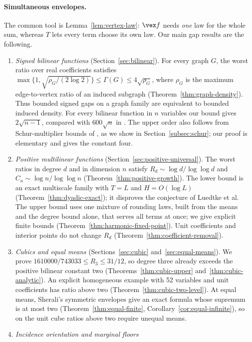 \documentclass[11pt]{article}
\begin{document}
\paragraph{Simultaneous envelopes.}
The common tool is Lemma~\ref{lem:vertex-law}: $\vex f$ needs \emph{one}
law for the whole sum, whereas $T$ lets every term choose its own law.
Our main gap results are the following.
\begin{enumerate}
\item \emph{Signed bilinear functions}
(Section~\ref{sec:bilinear}). For every graph $G$, the worst ratio over
real coefficients satisfies
$\max\{1,\sqrt{\rho_G/(2\log2)}\}\le\Gamma(G)\le4\sqrt{\rho_G}$, where
$\rho_G$ is the maximum edge-to-vertex ratio of an induced subgraph
(Theorem~\ref{thm:graph-density}). Thus bounded signed gaps on a graph
family are equivalent to bounded induced density. For every bilinear
function in $n$ variables our bound gives $2\sqrt{n-1}$, compared with
$600\sqrt n$ in \citet[Theorem 2]{Boland2017}. The upper order also
follows from Schur-multiplier bounds of \citet{DavidsonDonsig2007}, as we
show in Section~\ref{subsec:schur}; our proof is elementary and gives the
constant four.
\item \emph{Positive multilinear functions}
(Section~\ref{sec:positive-universal}). The worst ratios in degree $d$ and
in dimension $n$ satisfy $R_d\sim\log d/\log\log d$ and
$C_n\sim\log n/\log\log n$ (Theorem~\ref{thm:positive-growth}). The lower
bound is an exact multiscale family with $T=L$ and $H=O(\log L)$
(Theorem~\ref{thm:dyadic-exact}); it disproves the conjecture of Luedtke
et al. The upper bound uses one mixture of rounding laws, built from the
means and the degree bound alone, that serves all terms at once; we give
explicit finite bounds (Theorem~\ref{thm:harmonic-fixed-point}). Unit
coefficients and interior points do not change $R_d$
(Theorem~\ref{thm:coefficient-removal}).
\item \emph{Cubics and equal means} (Sections~\ref{sec:cubic}
and~\ref{sec:equal-means}). We prove $1610000/743033\le R_3\le31/12$, so
degree three already exceeds the positive bilinear constant two
(Theorems~\ref{thm:cubic-upper} and~\ref{thm:cubic-analytic}). An
explicit homogeneous example with 52 variables and unit coefficients has
ratio above two (Theorem~\ref{thm:cubic-two-level}). At equal means,
Sherali's symmetric envelopes give an exact formula whose supremum is at
most two (Theorem~\ref{thm:equal-finite}, Corollary~\ref{cor:equal-infinite}),
so on the unit cube ratios above two require unequal means.
\item \emph{Incidence orientation and marginal floors}

\end{enumerate}
\end{document}
